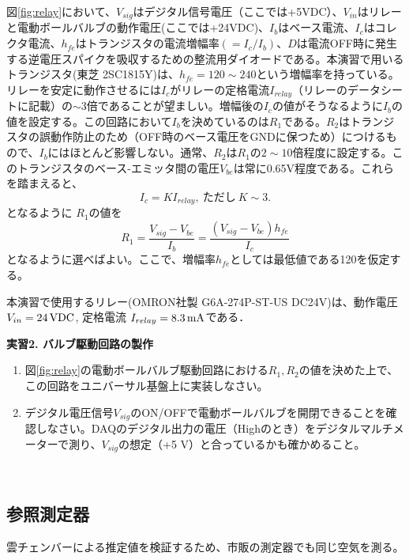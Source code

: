 \documentclass{ltjsarticle}
\begin{document}
図\ref{fig:relay}において、$V_{sig}$はデジタル信号電圧（ここでは+5VDC）、$V_{in}$はリレーと電動ボールバルブの動作電圧(ここでは+24VDC)、$I_{b}$はベース電流、$I_{c}$はコレクタ電流、$h_{fe}$はトランジスタの電流増幅率$(=I_{c}/I_{b})$、$D$は電流OFF時に発生する逆電圧スパイクを吸収するための整流用ダイオードである。本演習で用いるトランジスタ(東芝 2SC1815Y)は、$h_{fe}=120 \sim 240$という増幅率を持っている。リレーを安定に動作させるには$I_{c}$がリレーの定格電流$I_{relay}$（リレーのデータシートに記載）の$\sim3$倍であることが望ましい。増幅後の$I_{c}$の値がそうなるように$I_{b}$の値を設定する。この回路において$I_{b}$を決めているのは$R_{1}$である。$R_{2}$はトランジスタの誤動作防止のため（OFF時のベース電圧をGNDに保つため）につけるもので、$I_{b}$にはほとんど影響しない。通常、$R_{2}$は$R_{1}$の$2 \sim 10$倍程度に設定する。このトランジスタのベース-エミッタ間の電圧$V_{be}$は常に0.65V程度である。これらを踏まえると、
\begin{equation}\label{eq:109}
 I_{c} = K I_{relay},\ ただし\  K\sim3.
\end{equation}
となるように $R_{1}$の値を
\begin{equation}\label{eq:110}
 R_{1}=\frac{V_{sig}-V_{be}}{I_{b}}=\frac{(V_{sig}-V_{be})h_{fe}}{I_{c}}
\end{equation}
となるように選べばよい。ここで、増幅率$h_{fe}$としては最低値である120を仮定する。

本演習で使用するリレー(OMRON社製 G6A-274P-ST-US DC24V)は、動作電圧 $V_{in}=24 \,\rm{VDC}$, 定格電流 $I_{relay}=8.3 \,\rm{mA}$である．
\\
\begin{itembox}[l]{\bf{実習2. バルブ駆動回路の製作}}
\begin{enumerate}
\item 図\ref{fig:relay}の電動ボールバルブ駆動回路における$R_{1},R_{2}$の値を決めた上で、この回路をユニバーサル基盤上に実装しなさい。
\item デジタル電圧信号$V_{sig}$のON/OFFで電動ボールバルブを開閉できることを確認しなさい。DAQのデジタル出力の電圧（Highのとき）をデジタルマルチメーターで測り、$V_{sig}$の想定（+5 V）と合っているかも確かめること。
\end{enumerate}
\end{itembox}
\\
\subsection{参照測定器}\label{sec:reference}
雲チェンバーによる推定値を検証するため、市販の測定器でも同じ空気を測る。
\end{document}
